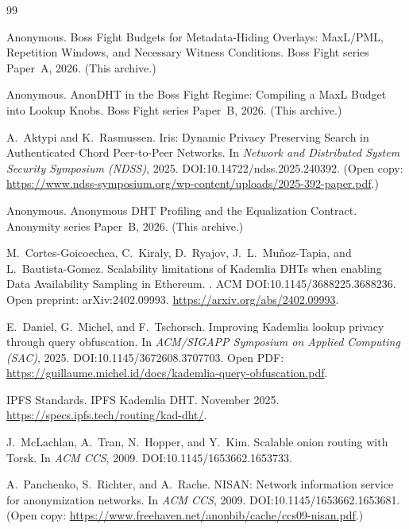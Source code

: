 \documentclass[11pt]{article}
\begin{document}
\begin{thebibliography}{99}

Anonymous.
\newblock Boss Fight Budgets for Metadata-Hiding Overlays: MaxL/PML, Repetition Windows, and Necessary Witness Conditions.
\newblock Boss Fight series Paper~A, 2026. (This archive.)

Anonymous.
\newblock AnonDHT in the Boss Fight Regime: Compiling a MaxL Budget into Lookup Knobs.
\newblock Boss Fight series Paper~B, 2026. (This archive.)

A.~Aktypi and K.~Rasmussen.
\newblock Iris: Dynamic Privacy Preserving Search in Authenticated Chord Peer-to-Peer Networks.
\newblock In \emph{Network and Distributed System Security Symposium (NDSS)}, 2025.
\newblock DOI:10.14722/ndss.2025.240392. (Open copy: \url{https://www.ndss-symposium.org/wp-content/uploads/2025-392-paper.pdf}.)

Anonymous.
\newblock Anonymous DHT Profiling and the Equalization Contract.
\newblock Anonymity series Paper~B, 2026. (This archive.)


M.~Cortes-Goicoechea, C.~Kiraly, D.~Ryajov, J.~L.~Mu\~noz-Tapia, and L.~Bautista-Gomez.
\newblock Scalability limitations of Kademlia DHTs when enabling Data Availability Sampling in Ethereum.
.
\newblock ACM DOI:10.1145/3688225.3688236. Open preprint: arXiv:2402.09993. \url{https://arxiv.org/abs/2402.09993}.

E.~Daniel, G.~Michel, and F.~Tschorsch.
\newblock Improving Kademlia lookup privacy through query obfuscation.
\newblock In \emph{ACM/SIGAPP Symposium on Applied Computing (SAC)}, 2025.
\newblock DOI:10.1145/3672608.3707703.
\newblock Open PDF: \url{https://guillaume.michel.id/docs/kademlia-query-obfuscation.pdf}.

IPFS Standards.
\newblock IPFS Kademlia DHT.
 November 2025. \url{https://specs.ipfs.tech/routing/kad-dht/}.

J.~McLachlan, A.~Tran, N.~Hopper, and Y.~Kim.
\newblock Scalable onion routing with Torsk.
\newblock In \emph{ACM CCS}, 2009.
\newblock DOI:10.1145/1653662.1653733.

A.~Panchenko, S.~Richter, and A.~Rache.
\newblock NISAN: Network information service for anonymization networks.
\newblock In \emph{ACM CCS}, 2009.
\newblock DOI:10.1145/1653662.1653681. (Open copy: \url{https://www.freehaven.net/anonbib/cache/ccs09-nisan.pdf}.)


\end{thebibliography}
\end{document}

